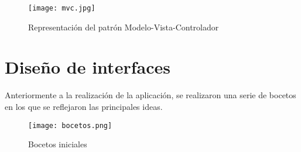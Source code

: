 \begin{figure}[!h]
	\centering
	\texttt{[image: mvc.jpg]}
	\caption{Representación del patrón Modelo-Vista-Controlador~\cite{mvc}}\label{fig:mvc}
\end{figure}

\section{Diseño de interfaces}

Anteriormente a la realización de la aplicación, se realizaron una serie de bocetos en los que se reflejaron las principales ideas.

\begin{figure}[!h]
	\centering
	\texttt{[image: bocetos.png]}
	\caption{Bocetos iniciales}\label{fig:bocetos}
\end{figure}







